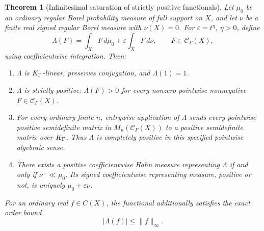 \documentclass[11pt,letterpaper]{article}
\newtheorem{theorem}{Theorem}[section]
\theoremstyle{definition}
\newcommand{\CH}{\mathscr C_\Gamma}
\newcommand{\eps}{\varepsilon}
\newcommand{\dd}{\,d}
\numberwithin{equation}{section}
\begin{document}
\begin{theorem}[Infinitesimal saturation of strictly positive functionals]\label{herg:thm:functional}
Let $\mu_0$ be an ordinary regular Borel probability measure of full support on $X$, and let $\nu$ be a finite real signed regular Borel measure with $\nu(X)=0$. For $\eps=t^\eta$, $\eta>0$, define
\begin{equation}\label{herg:eq:functional}
 \Lambda(F)=\int_X F\dd\mu_0+\eps\int_X F\dd\nu,
 \qquad F\in\CH(X),
\end{equation}
using coefficientwise integration. Then:
\begin{enumerate}[label=(\alph*)]
\item $\Lambda$ is $K_\Gamma$-linear, preserves conjugation, and $\Lambda(1)=1$.
\item $\Lambda$ is strictly positive: $\Lambda(F)>0$ for every nonzero pointwise nonnegative $F\in\CH(X)$.
\item For every ordinary finite $n$, entrywise application of $\Lambda$ sends every pointwise positive semidefinite matrix in $M_n(\CH(X))$ to a positive semidefinite matrix over $K_\Gamma$. Thus $\Lambda$ is completely positive in this specified pointwise algebraic sense.
\item There exists a positive coefficientwise Hahn measure representing $\Lambda$ if and only if $\nu^-\ll\mu_0$. Its signed coefficientwise representing measure, positive or not, is uniquely $\mu_0+\eps\nu$.
\end{enumerate}
For an ordinary real $f\in C(X)$, the functional additionally satisfies the exact order bound
\begin{equation}\label{herg:eq:ordinarybound}
 |\Lambda(f)|\le\|f\|_\infty.
\end{equation}
\end{theorem}
\end{document}
